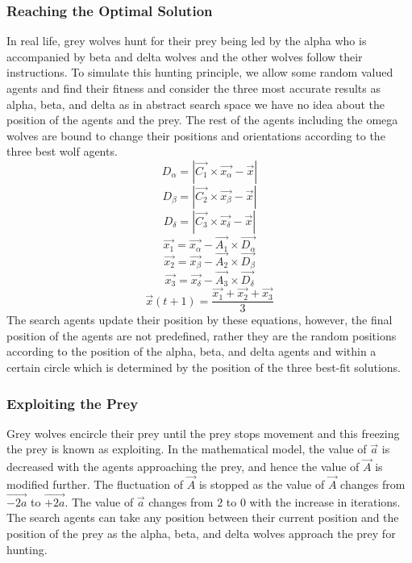 \documentclass{llncs}
\begin{document}
\subsubsection{Reaching the Optimal Solution}
In real life, grey wolves hunt for their prey being led by the alpha who is accompanied by beta and delta wolves and the other wolves follow their instructions. To simulate this hunting principle, we allow some random valued agents and find their fitness and consider the three most accurate results as alpha, beta, and delta as in abstract search space we have no idea about the position of the agents and the prey.  The rest of the agents including the omega wolves are bound to change their positions and orientations according to the three best wolf agents.
\begin{equation}
    D_{\alpha} = |\Vec{C_1}\times\Vec{x_{\alpha}}-\Vec{x}|
\end{equation}
\begin{equation}
    D_{\beta} = |\Vec{C_2}\times\Vec{x_{\beta}}-\Vec{x}|
\end{equation}
\begin{equation}
    D_{\delta} = |\Vec{C_3}\times\Vec{x_{\delta}}-\Vec{x}|
\end{equation}
\begin{equation}\label{update1}
    \Vec{x_{1}} = \Vec{x_{\alpha}}-\Vec{A_1}\times \Vec{D_{\alpha}}
\end{equation}
\begin{equation}\label{update2}
    \Vec{x_{2}} = \Vec{x_{\beta}}-\Vec{A_2}\times \Vec{D_{\beta}}
\end{equation}
\begin{equation}\label{update3}
    \Vec{x_{3}} = \Vec{x_{\delta}}-\Vec{A_3}\times \Vec{D_{\delta}}
\end{equation}
\begin{equation}
    \Vec{x}(t+1) = \frac{\Vec{x_1}+\Vec{x_2}+\Vec{x_3}}{3}
\end{equation}
The search agents update their position by these equations, however, the final position of the agents are not predefined, rather they are the random positions according to the position of the alpha, beta, and delta agents and within a certain circle which is determined by the position of the three best-fit solutions.
\subsubsection{Exploiting the Prey}
Grey wolves encircle their prey until the prey stops movement and this freezing the prey is known as exploiting. In the mathematical model, the value of $\Vec{a}$ is decreased with the agents approaching the prey, and hence the value of $\Vec{A}$ is modified further. The fluctuation of $\Vec{A}$ is stopped as the value of $\Vec{A}$ changes from $\Vec{-2a}$ to $\Vec{+2a}$. The value of $\Vec{a}$ changes from $2$ to $0$ with the increase in iterations. The search agents can take any position between their current position and the position of the prey as the alpha, beta, and delta wolves approach the prey for hunting.
\end{document}
